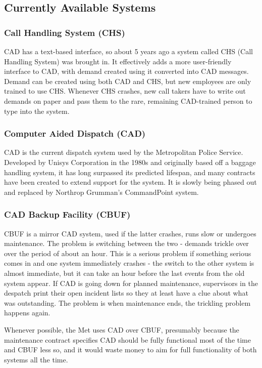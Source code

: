 \documentclass{article}
\begin{document}
    \subsection{Currently Available Systems}
\subsubsection{Call Handling System (CHS)}
CAD has a text-based interface, so about 5 years ago a system called CHS (Call Handling System) was brought in. It effectively adds a more user-friendly interface to CAD, with demand created using it converted into CAD messages. Demand can be created using both CAD and CHS, but new employees are only trained to use CHS. Whenever CHS crashes, new call takers have to write out demands on paper and pass them to the rare, remaining CAD-trained person to type into the system.

\subsubsection{Computer Aided Dispatch (CAD)}
CAD is the current dispatch system used by the Metropolitan Police Service. Developed by Unisys Corporation in the 1980s and originally based off a baggage handling system, it has long surpassed its predicted lifespan, and many contracts have been created to extend support for the system. It is slowly being phased out and replaced by Northrop Grumman’s CommandPoint system.

\subsubsection{CAD Backup Facility (CBUF)}
CBUF is a mirror CAD system, used if the latter crashes, runs slow or undergoes maintenance. The problem is switching between the two - demands trickle over over the period of about an hour. This is a serious problem if something serious comes in and one system immediately crashes - the switch to the other system is almost immediate, but it can take an hour before the last events from the old system appear. If CAD is going down for planned maintenance, supervisors in the despatch print their open incident lists so they at least have a clue about what was outstanding. The problem is when maintenance ends, the trickling problem happens again.

Whenever possible, the Met uses CAD over CBUF, presumably because the maintenance contract specifies CAD should be fully functional most of the time and CBUF less so, and it would waste money to aim for full functionality of both systems all the time.
\end{document}

